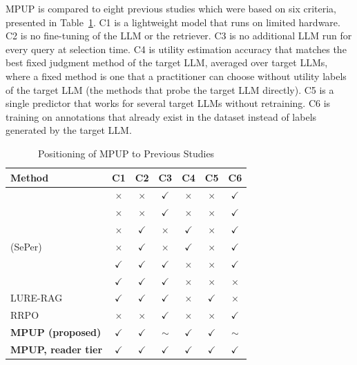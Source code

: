 \documentclass[preprint,12pt,authoryear]{elsarticle}
\begin{document}
MPUP is compared to eight previous studies which were based on six criteria, presented in Table~\ref{tab:mpup_positioning}. C1 is a lightweight model that runs on limited hardware. C2 is no fine-tuning of the LLM or the retriever. C3 is no additional LLM run for every query at selection time. C4 is utility estimation accuracy that matches the best fixed judgment method of the target LLM, averaged over target LLMs, where a fixed method is one that a practitioner can choose without utility labels of the target LLM (the methods that probe the target LLM directly). C5 is a single predictor that works for several target LLMs without retraining. C6 is training on annotations that already exist in the dataset instead of labels generated by the target LLM.


\begin{table}[htbp]
    \centering
    \small
    \setlength{\tabcolsep}{3pt}
    \caption{Positioning of MPUP to Previous Studies}
    \label{tab:mpup_positioning}
    \begin{tabular}{lcccccc}
        \toprule
        Method & C1 & C2 & C3 & C4 & C5 & C6 \\
        \midrule
        \citet{zhang2025b} & $\times$ & $\times$ & $\checkmark$ & $\times$ & $\times$ & $\checkmark$ \\
        \citet{sandhu2026} & $\times$ & $\times$ & $\checkmark$ & $\times$ & $\times$ & $\checkmark$ \\
        \citet{zhang2025c} & $\times$ & $\checkmark$ & $\times$ & $\checkmark$ & $\times$ & $\checkmark$ \\
        \citet{dai2025} (SePer) & $\times$ & $\checkmark$ & $\times$ & $\checkmark$ & $\times$ & $\checkmark$ \\
        \citet{perez2025} & $\checkmark$ & $\checkmark$ & $\checkmark$ & $\times$ & $\times$ & $\checkmark$ \\
        \citet{tian2026} & $\checkmark$ & $\checkmark$ & $\checkmark$ & $\times$ & $\times$ & $\times$ \\
        LURE-RAG \citep{chandra2026} & $\checkmark$ & $\checkmark$ & $\checkmark$ & $\times$ & $\checkmark$ & $\times$ \\
        RRPO \citep{wu2026} & $\times$ & $\times$ & $\checkmark$ & $\times$ & $\times$ & $\checkmark$ \\
        \textbf{MPUP (proposed)} & $\checkmark$ & $\checkmark$ & $\sim$ & $\checkmark$ & $\checkmark$ & $\sim$ \\
        \textbf{MPUP, reader tier} & $\checkmark$ & $\checkmark$ & $\checkmark$ & $\checkmark$ & $\checkmark$ & $\checkmark$ \\

\end{tabular}
\end{table}
\end{document}
